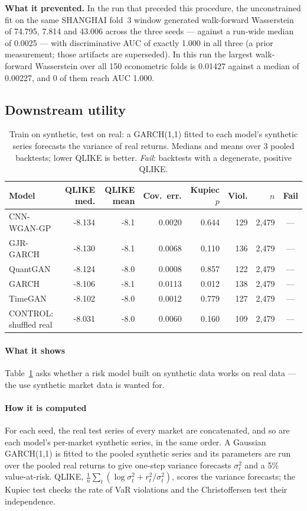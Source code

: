 \documentclass[11pt,a4paper]{article}
\makeatletter
\DeclareRobustCommand{\_}{\ifmmode\nfss@text{\textunderscore}\else\textunderscore\allowbreak\fi}
\makeatother
\begin{document}
\smallskip
\textbf{What it prevented.} In the run that preceded this procedure, the unconstrained fit on the same SHANGHAI fold~3 window generated walk-forward Wasserstein of 74.795, 7.814 and 43.006 across the three seeds --- against a run-wide median of 0.0025 --- with discriminative AUC of exactly 1.000 in all three (a prior measurement; those artifacts are superseded). In this run the largest walk-forward Wasserstein over all 150 econometric folds is 0.01427 against a median of 0.00227, and 0 of them reach AUC 1.000.

\subsection{Downstream utility}
\label{sec:downstream}

\begin{table}[htbp]
\centering
\caption{Train on synthetic, test on real: a GARCH(1,1) fitted to each model's synthetic series forecasts the variance of real returns. Medians and means over 3 pooled backtests; lower QLIKE is better. \emph{Fail}: backtests with a degenerate, positive QLIKE.}
\label{tab:downstream}
\begin{tabular}{@{}lrrrrrrc@{}}
\toprule
Model & QLIKE med. & QLIKE mean & Cov.\ err. & Kupiec $p$ & Viol. & $n$ & Fail \\
\midrule
CNN-WGAN-GP & -8.134 & -8.1 & 0.0020 & 0.644 & 129 & 2,479 & --- \\
GJR-GARCH & -8.130 & -8.1 & 0.0068 & 0.110 & 136 & 2,479 & --- \\
QuantGAN & -8.124 & -8.0 & 0.0008 & 0.857 & 122 & 2,479 & --- \\
GARCH & -8.106 & -8.1 & 0.0113 & 0.012 & 138 & 2,479 & --- \\
TimeGAN & -8.102 & -8.0 & 0.0012 & 0.779 & 127 & 2,479 & --- \\
CONTROL: shuffled real & -8.031 & -8.0 & 0.0060 & 0.160 & 109 & 2,479 & --- \\
\bottomrule
\end{tabular}
\end{table}

\paragraph{What it shows} Table~\ref{tab:downstream} asks whether a risk model built on synthetic data works on real data --- the use synthetic market data is wanted for.

\paragraph{How it is computed} For each seed, the real test series of every market are concatenated, and so are each model's per-market synthetic series, in the same order. A Gaussian GARCH(1,1) is fitted to the pooled synthetic series and its parameters are run over the pooled real returns to give one-step variance forecasts $\sigma_t^2$ and a 5\% value-at-risk. QLIKE, $\frac1n\sum_t(\log\sigma_t^2+r_t^2/\sigma_t^2)$, scores the variance forecasts; the Kupiec test checks the rate of VaR violations and the Christoffersen test their independence.
\end{document}
